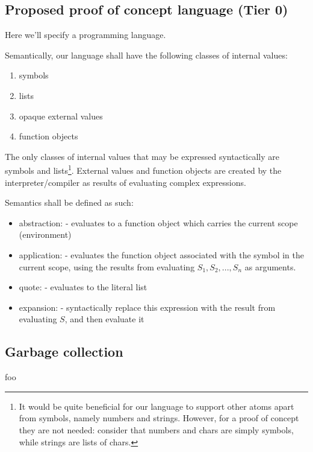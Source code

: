 \documentclass[main.tex]{subfiles}
\begin{document}
\subsection{Proposed proof of concept language (Tier 0)}

Here we'll specify a programming language.

Semantically, our language shall have the following classes of internal values:
\begin{enumerate}
    \item symbols
    \item lists
    \item opaque external values
    \item function objects
\end{enumerate}

The only classes of internal values that may be expressed syntactically are
symbols and lists\footnote{%
    It would be quite beneficial for our language to
    support other atoms apart from symbols, namely numbers and strings.
    However, for a proof of concept they are not needed: consider that numbers
    and chars are simply symbols, while strings are lists of chars.}.
External values and function objects are created by the interpreter/compiler as
results of evaluating complex expressions.

Semantics shall be defined as such:

\begin{itemize}
    \item abstraction:  - evaluates to
        a function object which carries the current scope (environment)
    \item application:  - evaluates the function
        object associated with the symbol  in the current scope,
        using the results from evaluating \(S_1, S_2, ..., S_n\) as arguments.
    \item quote:  - evaluates to the literal
        list 
    \item expansion:  - syntactically replace this expression
        with the result from evaluating \(S\), and then evaluate it
\end{itemize}

\subsection{Garbage collection}
foo
\end{document}
